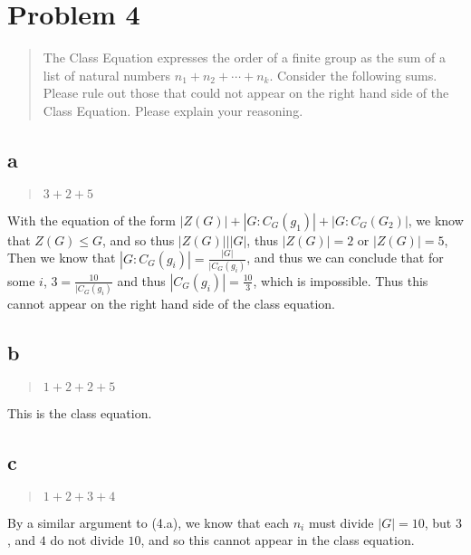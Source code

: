 \hypertarget{problem-4}{%
\section{Problem 4}\label{problem-4}}

\begin{quote}
The Class Equation expresses the order of a finite group as the sum of a
list of natural numbers \(n_1+n_2+\cdots+n_k\). Consider the following
sums. Please rule out those that could not appear on the right hand side
of the Class Equation. Please explain your reasoning.
\end{quote}

\hypertarget{a-2}{%
\subsection{a}\label{a-2}}

\begin{quote}
\(3+2+5\)
\end{quote}

With the equation of the form \(|Z(G)|+|G:C_G(g_1)|+|G:C_G(G_2)|\), we
know that \(Z(G)\leq G\), and so thus \(|Z(G)|\big\vert|G|\), thus
\(|Z(G)|=2\) or \(|Z(G)|=5\), Then we know that
\(|G:C_G(g_i)|=\frac{|G|}{|C_G(g_i)}\), and thus we can conclude that
for some \(i\), \(3=\frac{10}{|C_G(g_i)}\) and thus
\(|C_G(g_i)|=\frac{10}{3}\), which is impossible. Thus this cannot
appear on the right hand side of the class equation.

\hypertarget{b-2}{%
\subsection{b}\label{b-2}}

\begin{quote}
\(1+2+2+5\)
\end{quote}

This is the class equation.

\hypertarget{c-2}{%
\subsection{c}\label{c-2}}

\begin{quote}
\(1+2+3+4\)
\end{quote}

By a similar argument to (4.a), we know that each \(n_i\) must divide
\(|G|=10\), but \(3\), and \(4\) do not divide \(10\), and so this
cannot appear in the class equation.

